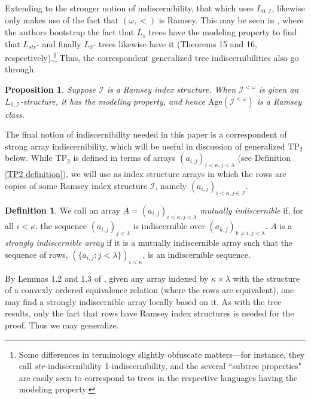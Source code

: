 \documentclass{article}
\newcommand{\calI}{\mathcal{I}}
\newcommand{\TPii}{\text{TP}_2}
\newtheorem{proposition}{Proposition}
\theoremstyle{definition}
\newtheorem{definition}{Definition}
\theoremstyle{definition}
\theoremstyle{definition}
\theoremstyle{definition}
\begin{document}
Extending to the stronger notion of indiscernibility, that which uses $L_{0,\calI}$, likewise only makes use of the fact that $(\omega,<)$ is Ramsey. This may be seen in \cite{TAKEUCHI_Tsuboi_2012}, where the authors bootstrap the fact that $L_{s}$ trees have the modeling property to find that $L_{str}$- and finally $L_0$- trees likewise have it (Theorems 15 and 16, respectively).\footnote{Some differences in terminology slightly obfuscate matters---for instance, they call $str$-indiscernibility 1-indiscernibility, and the several ``subtree properties" are easily seen to correspond to trees in the respective languages having the modeling property.} Thus, the correspondent generalized tree indiscernibilities also go through.

\begin{proposition}{}\label{L_0,I trees have modeling property}
    Suppose $\calI$ is a Ramsey index structure. When $\calI^{<\omega}$ is given an $L_{0,\calI}$-structure, it has the modeling property, and hence $\text{Age}(\calI^{<\omega})$ is a Ramsey class.

\end{proposition}

The final notion of indiscernibility needed in this paper is a correspondent of strong array indiscernibility, which will be useful in discussion of generalized $\TPii$ below. While $\TPii$ is defined in terms of arrays $(a_{i,j})_{i<\kappa,j<\lambda}$ (see Definition \ref{TP2 definition}), we will use as index structure arrays in which the rows are copies of some Ramsey index structure $\calI$, namely $(a_{i,j})_{i<\kappa,j\in\calI}$.


\begin{definition}
We call an array $A=(a_{i,j})_{i<\kappa,j<\lambda}$ \textit{mutually indiscernible} if, for all $i<\kappa$, the sequence $(a_{i,j})_{j<\lambda}$ is indiscernible over $(a_{k,j})_{k\neq i, j<\lambda}$. $A$ is a \textit{strongly indiscernible array} if it is a mutually indiscernible array such that the sequence of rows, $(\{a_{i,j}\colon j<\lambda\})_{i<\kappa}$, is an indiscernible sequence. 
\end{definition}

By Lemmas 1.2 and 1.3 of \cite{chernikov2014theories}, given any array indexed by $\kappa\times\lambda$ with the structure of a convexly ordered equivalence relation (where the rows are equivalent), one may find a strongly indiscernible array locally based on it. As with the tree results, only the fact that rows have Ramsey index structures is needed for the proof. Thus we may generalize. 
\end{document}
